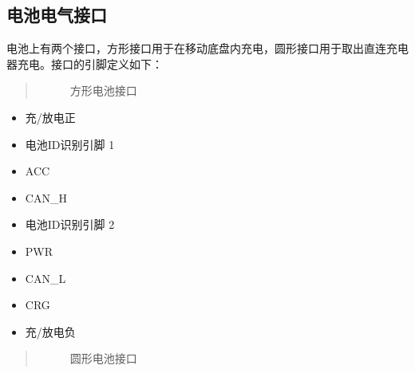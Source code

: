 \documentclass[a4paper,11pt,english,openany,oneside]{sphinxmanual}
\begin{document}
\subsection{电池电气接口}
\label{\detokenize{08 _u5b89_u88c5_u4e0e_u8c03_u8bd5:id23}}\label{\detokenize{08 _u5b89_u88c5_u4e0e_u8c03_u8bd5:id24}}
\sphinxAtStartPar
电池上有两个接口，方形接口用于在移动底盘内充电，圆形接口用于取出直连充电器充电。接口的引脚定义如下：
\begin{quote}

\begin{figure}[H]
\centering
\capstart

\noindent{}
\caption{方形电池接口}\label{\detokenize{08 _u5b89_u88c5_u4e0e_u8c03_u8bd5:id95}}\end{figure}
\end{quote}
\begin{itemize}
\item {} 
 充/放电正

\item {} 
 电池ID识别引脚 1

\item {} 
 ACC

\item {} 
 CAN\_H

\item {} 
 电池ID识别引脚 2

\item {} 
 PWR

\item {} 
 CAN\_L

\item {} 
 CRG

\item {} 
 充/放电负

\end{itemize}
\begin{quote}

\begin{figure}[H]
\centering
\capstart

\noindent{}
\caption{圆形电池接口}\label{\detokenize{08 _u5b89_u88c5_u4e0e_u8c03_u8bd5:id96}}\end{figure}
\end{quote}
\end{document}
